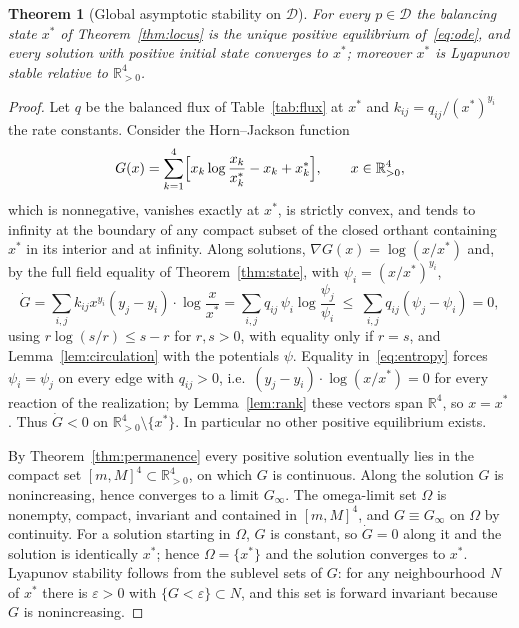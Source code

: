 \documentclass[11pt,a4paper]{article}
\theoremstyle{plain}
\newtheorem{theorem}{Theorem}[section]
\theoremstyle{definition}
\theoremstyle{remark}
\newcommand{\R}{\mathbb{R}}
\newcommand{\Rp}{\R_{>0}}
\newcommand{\DT}{\mathcal{D}}
\newcommand{\xs}{x^{*}}
\begin{document}
\begin{theorem}[Global asymptotic stability on $\DT$]\label{thm:gas}
For every $p\in\DT$ the balancing state $\xs$ of Theorem~\ref{thm:locus} is the unique positive equilibrium of~\eqref{eq:ode}, and every solution with positive initial state converges to $\xs$; moreover $\xs$ is Lyapunov stable relative to $\Rp^4$.
\end{theorem}
\begin{proof}
Let $q$ be the balanced flux of Table~\ref{tab:flux} at $\xs$ and $k_{ij}=q_{ij}/(\xs)^{y_i}$ the rate constants. Consider the Horn--Jackson function~\cite{HornJackson1972}
\[
G(x)=\sum_{k=1}^4\Bigl[x_k\log\frac{x_k}{x_k^*}-x_k+x_k^*\Bigr],\qquad x\in\Rp^4,
\]
which is nonnegative, vanishes exactly at $\xs$, is strictly convex, and tends to infinity at the boundary of any compact subset of the closed orthant containing $\xs$ in its interior and at infinity. Along solutions, $\nabla G(x)=\log(x/\xs)$ and, by the full field equality of Theorem~\ref{thm:state}, with $\psi_i=(x/\xs)^{y_i}$,
\begin{equation}\label{eq:entropy}
\dot G=\sum_{i,j}k_{ij}x^{y_i}(y_j-y_i)\cdot\log\frac x{\xs}
=\sum_{i,j}q_{ij}\,\psi_i\log\frac{\psi_j}{\psi_i}
\ \le\ \sum_{i,j}q_{ij}(\psi_j-\psi_i)=0 ,
\end{equation}
using $r\log(s/r)\le s-r$ for $r,s>0$, with equality only if $r=s$, and Lemma~\ref{lem:circulation} with the potentials $\psi$. Equality in~\eqref{eq:entropy} forces $\psi_i=\psi_j$ on every edge with $q_{ij}>0$, i.e.\ $(y_j-y_i)\cdot\log(x/\xs)=0$ for every reaction of the realization; by Lemma~\ref{lem:rank} these vectors span $\R^4$, so $x=\xs$. Thus $\dot G<0$ on $\Rp^4\setminus\{\xs\}$. In particular no other positive equilibrium exists.

By Theorem~\ref{thm:permanence} every positive solution eventually lies in the compact set $[m,M]^4\subset\Rp^4$, on which $G$ is continuous. Along the solution $G$ is nonincreasing, hence converges to a limit $G_\infty$. The omega-limit set $\Omega$ is nonempty, compact, invariant and contained in $[m,M]^4$, and $G\equiv G_\infty$ on $\Omega$ by continuity. For a solution starting in $\Omega$, $G$ is constant, so $\dot G=0$ along it and the solution is identically $\xs$; hence $\Omega=\{\xs\}$ and the solution converges to $\xs$. Lyapunov stability follows from the sublevel sets of $G$: for any neighbourhood $N$ of $\xs$ there is $\varepsilon>0$ with $\{G<\varepsilon\}\subset N$, and this set is forward invariant because $G$ is nonincreasing.
\end{proof}
\end{document}
